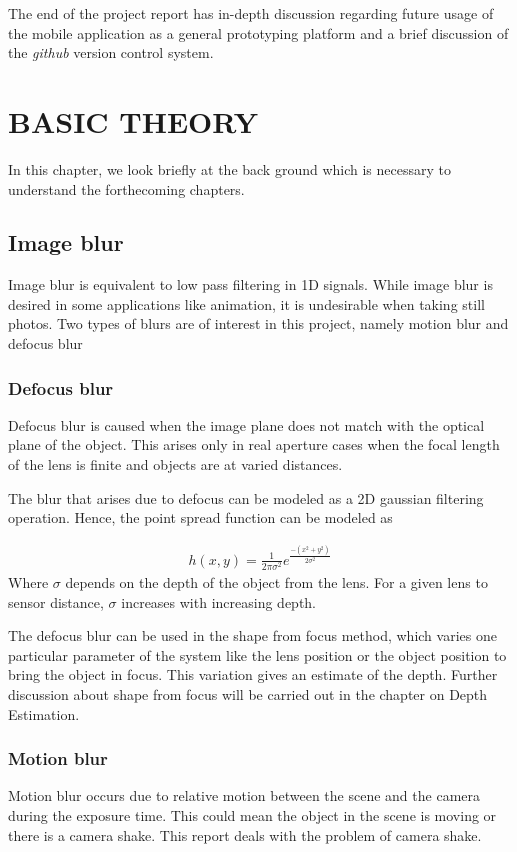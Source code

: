 \documentclass[BTech]{iitmdiss}
\begin{document}
The end of the project report has in-depth discussion regarding future
usage of the mobile application as a general prototyping platform and a
brief discussion of the \emph{github} version control system.

\chapter{BASIC THEORY}
\label{chap:basic_theory}
In this chapter, we look briefly at the back ground which is necessary 
to understand the forthecoming chapters. 

\section{Image blur}
\label{basic_theory:image_blur}
Image blur is equivalent to low pass filtering in 1D signals. While 
image blur is desired in some applications like animation, it is 
undesirable when taking still photos. Two types of blurs are of interest
in this project, namely motion blur and defocus blur

\subsection{Defocus blur}
\label{basic_theory:image_blur:optical}
Defocus blur is caused when the image plane does not match with the 
optical plane of the object. This arises only in real aperture cases
when the focal length of the lens is finite and objects are at varied
distances. 

The blur that arises due to defocus can be modeled as a 2D gaussian
filtering operation. Hence, the point spread function can be modeled as

\begin{align*}
h(x,y) = \frac{1}{2\pi\sigma^2}e^\frac{-(x^2+y^2)}{2\sigma^2}
\end{align*}
Where $\sigma$ depends on the depth of the object from the lens. For a 
given lens to sensor distance, $\sigma$ increases with increasing depth.

The defocus blur can be used in the shape from focus method, which 
varies one particular parameter of the system like the lens position or
the object position to bring the object in focus. This variation gives 
an estimate of the depth. Further discussion about shape from focus will
be carried out in the chapter on Depth Estimation.

\subsection{Motion blur}
Motion blur occurs due to relative motion between the scene and the 
camera during the exposure time. This could mean the object in the scene
is moving or there is a camera shake. This report deals with the problem
of camera shake.
\end{document}
